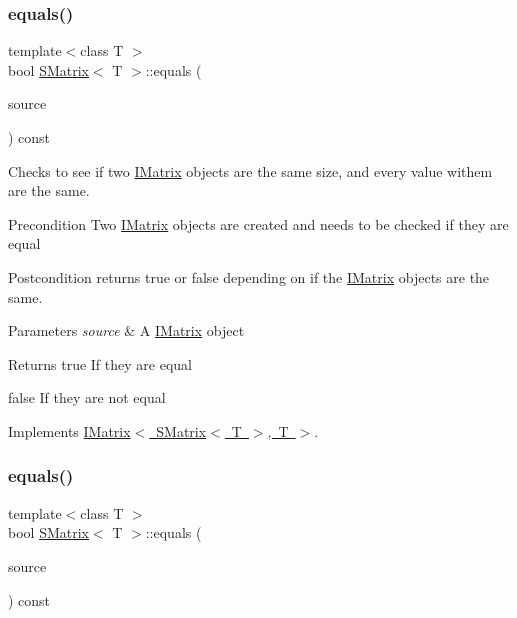 \subsubsection{\texorpdfstring{equals()}{equals()}\hspace{0.1cm}{\footnotesize\ttfamily [5/6]}}
{\footnotesize\ttfamily template$<$class T $>$ \\
bool \mbox{\hyperlink{class_s_matrix}{S\+Matrix}}$<$ T $>$\+::equals (\begin{DoxyParamCaption}\item[{const \mbox{\hyperlink{class_i_matrix}{I\+Matrix}}$<$ \mbox{\hyperlink{class_s_matrix}{S\+Matrix}}$<$ T $>$, T $>$ \&}]{source }\end{DoxyParamCaption}) const\hspace{0.3cm}{\ttfamily [virtual]}}



Checks to see if two \mbox{\hyperlink{class_i_matrix}{I\+Matrix}} objects are the same size, and every value withem are the same. 

\begin{DoxyPrecond}{Precondition}
Two \mbox{\hyperlink{class_i_matrix}{I\+Matrix}} objects are created and needs to be checked if they are equal 
\end{DoxyPrecond}
\begin{DoxyPostcond}{Postcondition}
returns true or false depending on if the \mbox{\hyperlink{class_i_matrix}{I\+Matrix}} objects are the same.
\end{DoxyPostcond}

\begin{DoxyParams}{Parameters}
{\em source} & A \mbox{\hyperlink{class_i_matrix}{I\+Matrix}} object \\
\hline
\end{DoxyParams}
\begin{DoxyReturn}{Returns}
true If they are equal 

false If they are not equal 
\end{DoxyReturn}


Implements \mbox{\hyperlink{class_i_matrix_afa03122ed7ddb531656ce27690f8fb03}{I\+Matrix$<$ S\+Matrix$<$ T $>$, T $>$}}.

\mbox{\label{class_s_matrix_a7d26cfada671d72f934ddd4acbc59e0b}} 
\subsubsection{\texorpdfstring{equals()}{equals()}\hspace{0.1cm}{\footnotesize\ttfamily [6/6]}}
{\footnotesize\ttfamily template$<$class T $>$ \\
bool \mbox{\hyperlink{class_s_matrix}{S\+Matrix}}$<$ T $>$\+::equals (\begin{DoxyParamCaption}\item[{const \mbox{\hyperlink{class_i_matrix}{I\+Matrix}}$<$ \mbox{\hyperlink{class_d_matrix}{D\+Matrix}}$<$ T $>$, T $>$ \&}]{source }\end{DoxyParamCaption}) const}



